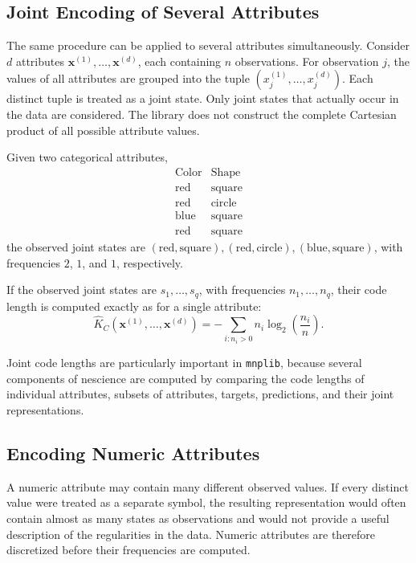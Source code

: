 \subsection*{Joint Encoding of Several Attributes}

The same procedure can be applied to several attributes simultaneously. Consider $d$ attributes $\mathbf{x}^{(1)},\ldots,\mathbf{x}^{(d)}$, each containing $n$ observations. For observation $j$, the values of all attributes are grouped into the tuple $\left(x^{(1)}_j,\ldots,x^{(d)}_j\right)$. Each distinct tuple is treated as a joint state. Only joint states that actually occur in the data are considered. The library does not construct the complete Cartesian product of all possible attribute values.

\begin{example}
Given two categorical attributes,
$$
\begin{array}{c|c}
\text{Color} & \text{Shape}\\
\hline
\text{red} & \text{square}\\
\text{red} & \text{circle}\\
\text{blue} & \text{square}\\
\text{red} & \text{square}
\end{array}
$$
the observed joint states are $(\text{red},\text{square}), (\text{red},\text{circle}), (\text{blue},\text{square})$, with frequencies $2$, $1$, and $1$, respectively.
\end{example}

If the observed joint states are $s_1,\ldots,s_q$, with frequencies $n_1,\ldots,n_q$, their code length is computed exactly as for a single attribute:
$$
\hat{K}_C \left(\mathbf{x}^{(1)},\ldots,\mathbf{x}^{(d)} \right) =
-\sum_{i:n_i>0} n_i \log_2 \left( \frac{n_i}{n} \right).
$$

Joint code lengths are particularly important in \texttt{mnplib}, because several components of nescience are computed by comparing the code lengths of individual attributes, subsets of attributes, targets, predictions, and their joint representations.

\subsection*{Encoding Numeric Attributes}

A numeric attribute may contain many different observed values. If every distinct value were treated as a separate symbol, the resulting representation would often contain almost as many states as observations and would not provide a useful description of the regularities in the data. Numeric attributes are therefore discretized before their frequencies are computed.

